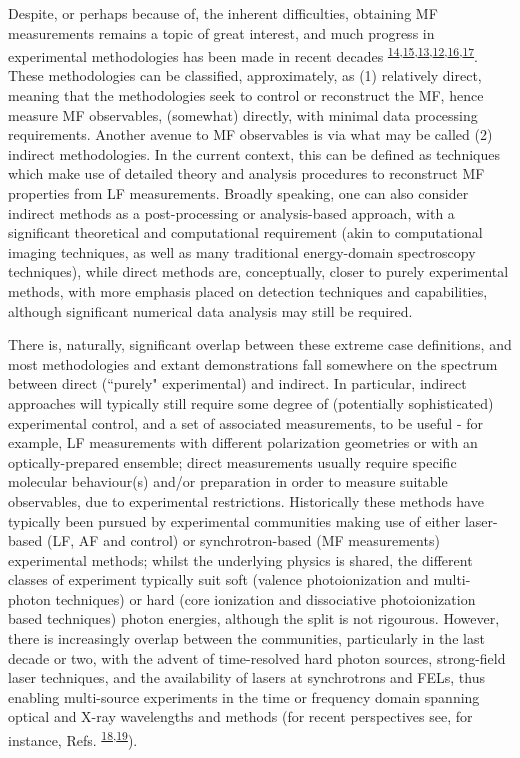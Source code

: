 \documentclass[10pt]{article}
\begin{document}
Despite, or perhaps because of, the inherent difficulties, obtaining  MF measurements remains a topic of great interest, and much progress in experimental methodologies has been made in recent decades \textsuperscript{\hyperref[csl:14]{14},\hyperref[csl:15]{15},\hyperref[csl:13]{13},\hyperref[csl:12]{12},\hyperref[csl:16]{16},\hyperref[csl:17]{17}}. %
These methodologies can be classified, approximately, as (1) relatively direct, meaning that the methodologies seek to control or reconstruct the MF, hence measure MF observables, (somewhat) directly, with minimal data processing requirements. Another avenue to MF observables is via what may be called (2) indirect methodologies. In the current context, this can be defined as techniques which make use of detailed theory and analysis procedures to reconstruct MF properties from LF measurements. Broadly speaking, one can also consider indirect methods as a post-processing or analysis-based approach, with a significant theoretical and computational requirement (akin to computational imaging techniques, as well as many traditional energy-domain spectroscopy techniques), while direct methods are, conceptually, closer to purely experimental methods, with more emphasis placed on detection techniques and capabilities, although significant numerical data analysis may still be required. 

There is, naturally, significant overlap between these extreme case definitions, and most methodologies and extant demonstrations fall somewhere on the spectrum between direct (``purely" experimental) and indirect. In particular, indirect approaches will typically still require some degree of (potentially sophisticated) experimental control, and a set of associated measurements, to be useful - for example, LF measurements with different polarization geometries or with an optically-prepared ensemble; direct measurements usually require specific molecular behaviour(s) and/or preparation in order to measure suitable observables, due to experimental restrictions. Historically these methods have typically been pursued by experimental communities making use of either laser-based (LF, AF and control) or synchrotron-based (MF measurements) experimental methods; whilst the underlying physics is shared, the different classes of experiment typically suit soft (valence photoionization and multi-photon techniques) or hard (core ionization and dissociative photoionization based techniques) photon energies, although the split is not rigourous. However, there is increasingly overlap between the communities, particularly in the last decade or two, with the advent of time-resolved hard photon sources, strong-field laser techniques, and the availability of lasers at synchrotrons and FELs, thus enabling multi-source experiments in the time or frequency domain spanning optical and X-ray wavelengths and methods (for recent perspectives see, for instance, Refs. \textsuperscript{\hyperref[csl:18]{18},\hyperref[csl:19]{19}}).
\end{document}
